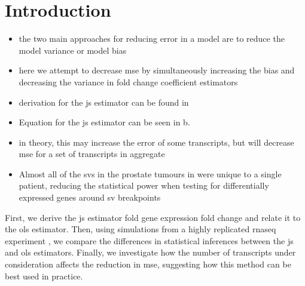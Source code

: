 \section{Introduction}

\begin{itemize}
  \item the two main approaches for reducing error in a model are to reduce the model variance or model bias 
  \item here we attempt to decrease \gls{mse} by simultaneously increasing the bias and decreasing the variance in fold change coefficient estimators
  \item derivation for the \gls{js} estimator can be found in 
  \item Equation for the \gls{js} estimator can be seen in b. 
  \item in theory, this may increase the error of some transcripts, but will decrease \gls{mse} for a set of transcripts in aggregate 
  \item Almost all of the \glspl{sv} in the prostate tumours in  were unique to a single patient, reducing the statistical power when testing for differentially expressed genes around \gls{sv} breakpoints
\end{itemize}


First, we derive the \gls{js} estimator fold gene expression fold change and relate it to the \gls{ols} estimator.
Then, using simulations from a highly replicated \gls{rnaseq} experiment \cite{gierlinskiStatisticalModelsRNAseq2015}, we compare the differences in statistical inferences between the \gls{js} and \gls{ols} estimators.
Finally, we investigate how the number of transcripts under consideration affects the reduction in \gls{mse}, suggesting how this method can be best used in practice.
